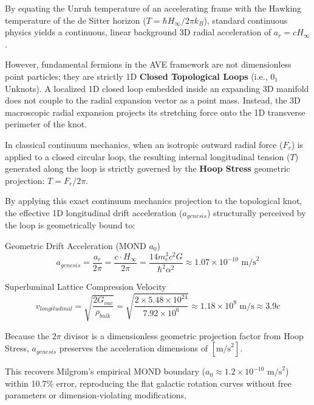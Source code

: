 By equating the Unruh temperature of an accelerating frame with the Hawking temperature of the de Sitter horizon ($T=\hbar H_{\infty}/2\pi k_{B}$), standard continuous physics yields a continuous, linear background 3D radial acceleration of $a_r = c H_{\infty}$.

However, fundamental fermions in the AVE framework are not dimensionless point particles;
they are strictly 1D \textbf{Closed Topological Loops} (i.e., $0_{1}$ Unknots). A localized 1D closed loop embedded inside an expanding 3D manifold does not couple to the radial expansion vector as a point mass. Instead, the 3D macroscopic radial expansion projects its stretching force onto the 1D transverse perimeter of the knot.

In classical continuum mechanics, when an isotropic outward radial force ($F_r$) is applied to a closed circular loop, the resulting internal longitudinal tension ($T$) generated along the loop is strictly governed by the \textbf{Hoop Stress} geometric projection: $T = F_r / 2\pi$.

By applying this exact continuum mechanics projection to the topological knot, the effective 1D longitudinal drift acceleration ($a_{genesis}$) structurally perceived by the loop is geometrically bound to:

\begin{resultbox}{Geometric Drift Acceleration (MOND $a_0$)}
\begin{equation}
a_{genesis}=\frac{a_r}{2\pi}=\frac{c\cdot H_{\infty}}{2\pi} = \frac{14 m_e^3 c^2 G}{\hbar^2 \alpha^2} \approx 1.07 \times 10^{-10} \text{ m/s}^2
\end{equation}
\end{resultbox}
\begin{resultbox}{Superluminal Lattice Compression Velocity}
\begin{equation}
    v_{longitudinal} = \sqrt{\frac{2G_{vac}}{\rho_{bulk}}} = \sqrt{\frac{2 \times 5.48 \times 10^{24}}{7.92 \times 10^6}} \approx 1.18 \times 10^{9} \text{ m/s} \approx 3.9c
\end{equation}
\end{resultbox}

Because the $2\pi$ divisor is a dimensionless geometric projection factor from Hoop Stress, $a_{genesis}$ preserves the acceleration dimensions of $[\text{m/s}^2]$.

This recovers Milgrom's empirical MOND boundary ($a_{0}\approx1.2\times10^{-10}\text{ m/s}^{2}$) within
10.7\% error, reproducing the flat galactic rotation curves without free parameters or dimension-violating modifications.

